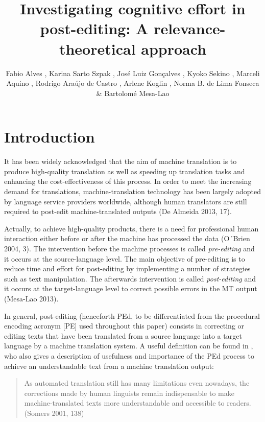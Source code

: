 \documentclass[output=paper]{langsci/langscibook}
\author{%
Fabio Alves{\ufmg}%
,
Karina Sarto Szpak{\ufmg}%
,
José Luiz Gonçalves{\ufop}%
,
Kyoko Sekino{\ufmg}%
,
Marceli Aquino{\ufmg}%
,
Rodrigo Araújo de Castro{\ufmg}%
,
Arlene Koglin{\ufmg}%
,
Norma B. de Lima Fonseca{\ufmg}%
 \&
Bartolomé Mesa-Lao{\cbs}
\affiliation{{\ufmg} UFMG {\ufop}UFOP {\cbs}CBS}%
}
\title{Investigating cognitive effort in post-editing: {A} relevance-theoretical approach}
\begin{document}

\section{Introduction}

It has been widely acknowledged that the aim of machine translation is to produce high-quality translation as well as speeding up translation tasks and enhancing the cost-effectiveness of this process. In order to meet the increasing demand for translations, machine-translation technology has been largely adopted by language service providers worldwide, although human translators are still required to post-edit machine-translated outputs (De Almeida 2013, 17). 


Actually, to achieve high-quality products, there is a need for professional human interaction either before or after the machine has processed the data (O´Brien 2004, 3). The intervention before the machine processes is called \textit{pre-editing} and it occurs at the source-language level. The main objective of pre-editing is to reduce time and effort for post-editing by implementing a number of strategies such as text manipulation. The afterwards intervention is called \textit{post-editing} and it occurs at the target-language level to correct possible errors in the MT output (Mesa-Lao 2013). 



In general, post-editing (henceforth PEd, to be differentiated from the procedural encoding acronym [PE] used throughout this paper) consists in correcting or editing texts that have been translated from a source language into a target language by a machine translation system. A useful definition can be found in \citet{Somers2001}, who also gives a description of usefulness and importance of the PEd process to achieve an understandable text from a machine translation output: 


\begin{quote}
As automated translation still has many limitations even nowadays, the corrections made by human linguists remain indispensable to make machine-translated texts more understandable and accessible to readers. (Somers 2001, 138)
\end{quote}
\end{document}
